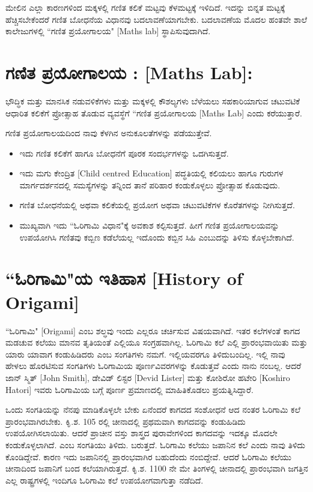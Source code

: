  ಮೇಲಿನ ಎಲ್ಲಾ ಕಾರಣಗಳಿಂದ ಮಕ್ಕಳಲ್ಲಿ ಗಣಿತ ಕಲಿಕೆ ಮಟ್ಟವು ಕೆಳಮಟ್ಟಕ್ಕೆ  ಇಳಿದಿದೆ. ಇದನ್ನು ಬಿನ್ನತ ಮಟ್ಟಕ್ಕೆ ಹೆಚ್ಚಿಸಬೇಕೆಂದರೆ ಗಣಿತ ಬೋಧನೆಯ ವಿಧಾನವು ಬದಲಾವಣೆಯಾಗಬೇಕು. ಬದಲಾವಣೆಯ ಮೊದಲ ಹಂತವೇ ಶಾಲೆ ಕಾಲೇಜುಗಳಲ್ಲಿ ``ಗಣಿತ ಪ್ರಯೋಗಾಲಯ" [Maths lab] ಸ್ಥಾಪಿಸುವುದಾಗಿದೆ.
  
 \section*{ಗಣಿತ ಪ್ರಯೋಗಾಲಯ : [Maths Lab]:} ಭೌದ್ಧಿಕ ಮತ್ತು ಮಾನಸಿಕ ನಡುವಳಿಕೆಗಳು ಮತ್ತು ಮಕ್ಕಳಲ್ಲಿ ಕೌಶಲ್ಯಗಳು ಬೆಳೆಯಲು ಸಹಕಾರಿಯಾಗುವ ಚಟುವಟಿಕೆ ಆಧಾರಿತ ಕಲಿಕೆಗೆ ಪ್ರೋತ್ಸಾಹ ತೊಡುವ ವ್ಯವಸ್ಥೆಗೆ ``ಗಣಿತ ಪ್ರಯೋಗಾಲಯ [Maths Lab] ಎಂದು ಕರೆಯುತ್ತಾರೆ. 
 
 ಗಣಿತ ಪ್ರಯೋಗಾಲಯದಿಂದ ನಾವು ಕೆಳಗಿನ ಅನುಕೂಲತೆಗಳನ್ನು ಪಡೆಯುತ್ತೇವೆ.
 \begin{itemize}
 \item ಇದು ಗಣಿತ ಕಲಿಕೆಗೆ ಹಾಗೂ ಬೋಧನೆಗೆ ಪೂರಕ ಸಂದರ್ಭಗಳನ್ನು ಒದಗಿಸುತ್ತದೆ.
 \item ಇದು ಮಗು ಕೇಂದ್ರಿತ [Child centred Education] ಪದ್ಧತಿಯಲ್ಲಿ ಕಲಿಯಲು ಹಾಗೂ ಗುರುಗಳ ಮಾರ್ಗದರ್ಶನದಲ್ಲಿ ಸಮಸ್ಯೆಗಳನ್ನು ತನ್ನಿಂದ ತಾನೆ ಪರಿಹಾರ ಕಂಡುಕೊಳ್ಳಲು ಪ್ರೋತ್ಸಾಹ ಕೊಡುವುದು. 
 \item ಗಣಿತ ಬೋಧನೆಯಲ್ಲಿ ಅಥವಾ ಕಲಿಕೆಯಲ್ಲಿ ಪ್ರಯೋಗ ಅಥವಾ ಚಟುವಟಿಕೆಗಳ ಕೊರೆತಗಳನ್ನು ನೀಗಿಸುತ್ತದೆ. 
 \item ಮುಖ್ಯವಾಗಿ ಇದು ``ಓರಿಗಾಮಿ ವಿಧಾನ"ಕ್ಕೆ ಅವಕಾಶ ಕಲ್ಪಿಸುತ್ತದೆ. ಹೀಗೆ ಗಣಿತ ಪ್ರಯೋಗಾಲಯವನ್ನು ಉಪಯೋಗಿಸಿ ಗಣಿತವು ಕಬ್ಬಿಣ ಕಡೆಲೆಯಲ್ಲ ಇದೊಂದು ಕಬ್ಬಿನ ಸಿಹಿ ಎಂಬುದನ್ನು ತಿಳಿಸು ಕೊಳ್ಳಬೇಕಾಗಿದೆ. 
 \end{itemize}


\section*{``ಓರಿಗಾಮಿ"ಯ ಇತಿಹಾಸ [History of Origami]}
``ಓರಿಗಾಮಿ" [Origami] ಎಂಬ ಶಲ್ಧವು ಇಂದು ಎಲ್ಲರೂ ಚರ್ಚಿಸುವ ವಿಷಯವಾಗಿದೆ. ಇತರ ಕಲೆಗಳಂತೆ ಕಾಗದ ಮಡಚುವ ಕಲೆಯು ಮಾನವ ತೃತಿಯಂತೆ ಎಲ್ಲಿಯೂ ಸಂಗ್ರಹವಾಗಿಲ್ಲ. ಓರಿಗಾಮಿ ಕಲೆ ಎಲ್ಲಿ ಪ್ರಾರಂಭವಾಯಿತು ಮತ್ತು ಯಾರು ಯಾವಾಗ ಕಂಡುಹಿಡಿದರು ಎಂಬ ಸಂಗತಿಗಳು ನಮಗೆ. ಇಲ್ಲಿಯವರಗೂ ತಿಳಿದುಬಂದಿಲ್ಲ. ಇಲ್ಲಿ ನಾವು ಹೇಳಲು ಹೊರಟಿಸುವ ಸಂಗತಿಗಳು ಓರಿಗಾಮಿಯ ಪೂರ್ಣವಿವರಗಳನ್ನು ಕೊಡುತ್ತವೆ ಎಂದು ನಾನು ನಂಬಲ್ಲ. ಆದರೆ ಜಾನ್ ಸ್ಮಿತ್ [John Smith], ಡೇವಿಡ್ ಲಿಸ್ಟರ [Devid Lister] ಮತ್ತು ಕೋಶಿರೋ ಹಟೇರಿ [Koshiro Hatori] ಇವರು ಓರಿಗಾಮಿಯ ಬಗ್ಗೆ ಪೂರ್ಣ ಪ್ರಮಾಣದಲ್ಲಿ ಮಾಹಿತಿಕೊಡಲು ಪ್ರಯತ್ನಿಸಿದ್ದಾರೆ. 

ಒಂದು ಸಂಗತಿಯನ್ನು ನೆನಪು ಮಾಡಿಕೊಳ್ಳಲೇ ಬೇಕು ಏನೆಂದರೆ ಕಾಗದದ ಸಂಶೋಧನೆ ಆದ ನಂತರ ಓರಿಗಾಮಿ ಕಲೆ ಪ್ರಾರಂಭವಾಗಿರಬೇಕು. ಕಿೃ.ಶ. 105 ರಲ್ಲಿ ಚೀನಾದಲ್ಲಿ ಪ್ರಥಮವಾಗಿ ಕಾಗದವನ್ನು ಕಂಡುಹಿಡಿದು ಉಪಯೋಗಿಸಲಾಯಿತು. ಆದರೆ ಪ್ರಾಚೀನ ವಸ್ತು ಶಾಸ್ತ್ರದ ಪುರಾವೇಗಳಿಂದ ಕಾಗದವನ್ನು ಇದಕ್ಕೂ ಮೊದಲೇ ಕಂಡುಕೊಳ್ಳಲಾಗಿದೆ. ಎಂಬ ಸಂಗತಿಯು ತಿಳಿದು. ಬರುತ್ತದೆ. ಓರಿಗಾಮಿ ಕಲೆಯು ಜಪಾನಿನ ಕಲೆ ಎಂದು ನಾವು ತಿಳಿದು ಕೊಂಡಿದ್ದೇವೆ. ಕಾರಣ ಇದು ಜಪಾನಿನಲ್ಲಿ ಪ್ರಾರಂಭವಾಗಿರ ಬಹುದೆಂದು ನಂಬಿದ್ದೇವೆ. ಆದರೆ ಓರಿಗಾಮಿ ಕಲೆಯು ಚೀನಾದಿಂದ ಜಪಾನಿಗೆ ಬಂದ ಕಲೆಯಾಗಿರುತ್ತದೆ. ಕಿೃ.ಶ. 1100 ನೇ ಮೇ ತಿಂಗಳಲ್ಲಿ ಚೀನಾದಲ್ಲಿ ಪ್ರಾರಂಭವಾಗಿ ಜಗತ್ತಿನ ಎಲ್ಲ ರಾಷ್ಟ್ರಗಳಲ್ಲಿ  ಇಂದಿಗೂ ಓರಿಗಾಮಿ ಕಲೆ ಉಪಯೋಗವಾಗುತ್ತಾ ನಡೆದಿದೆ. 

